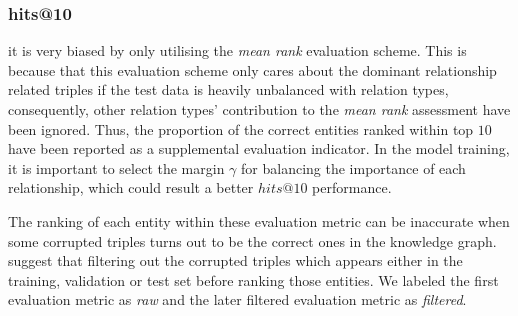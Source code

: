 \documentclass[10pt,journal]{IEEEtran}
\begin{document}
\subsubsection{hits@10} it is very biased by only utilising the \emph{mean rank} evaluation scheme. This is because that this evaluation scheme only cares about the dominant relationship related triples if the test data is heavily unbalanced with relation types, consequently,  other relation types' contribution to the \emph{mean rank} assessment have been ignored.  Thus, the proportion of the correct entities ranked within top $10$ have been reported as a supplemental evaluation indicator. In the model training, it is important to select the margin $\gamma$ for balancing the importance of each relationship, which could result a better $hits@10$ performance. 

The ranking of each entity within these evaluation metric can be inaccurate when some corrupted triples turns out to be the correct ones in the knowledge graph. \cite{bordes_translating_2013} suggest that filtering out the corrupted triples which appears either in the training, validation or test set before ranking those entities.  We labeled the first evaluation metric as \emph{raw} and the later filtered evaluation metric as \emph{filtered}.
\end{document}
